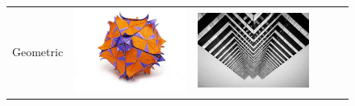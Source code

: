 \begin{figure}
\begin{minipage}[t]{\textwidth}
\begin{tabular}{m{.01\linewidth} m{.16\linewidth} m{.16\linewidth} m{.16\linewidth} m{.16\linewidth} m{.16\linewidth}}
    \begin{turn}{90}\small{Geometric}\end{turn} &
    \includegraphics[width=\linewidth]{../style/figures/flickr_on_flickr/pred_style_Geometric_Composition/0.jpg} &
    \includegraphics[width=\linewidth]{../style/figures/flickr_on_flickr/pred_style_Geometric_Composition/1.jpg} &

\end{tabular}
\end{minipage}
\end{figure}
